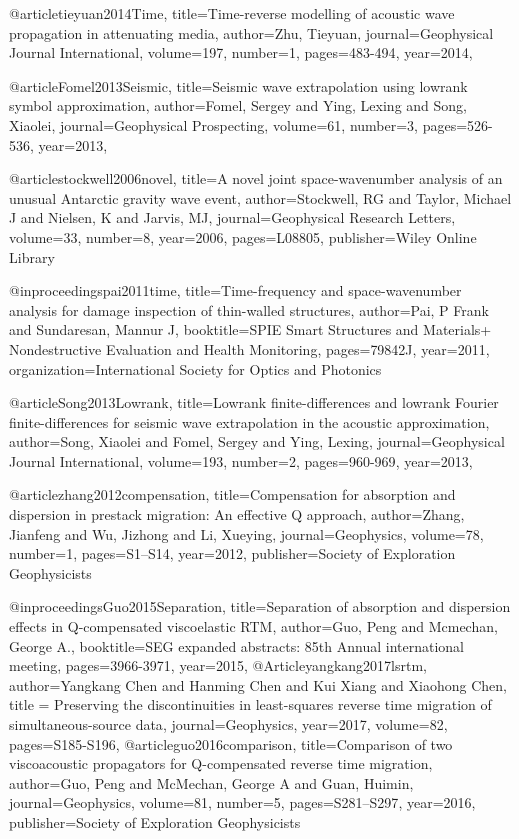 {@article{tieyuan2014Time,
  title={Time-reverse modelling of acoustic wave propagation in attenuating media},
  author={Zhu, Tieyuan},
  journal={Geophysical Journal International},
  volume={197},
  number={1},
  pages={483-494},
  year={2014},
}

@article{Fomel2013Seismic,
  title={Seismic wave extrapolation using lowrank symbol approximation},
  author={Fomel, Sergey and Ying, Lexing and Song, Xiaolei},
  journal={Geophysical Prospecting},
  volume={61},
  number={3},
  pages={526-536},
  year={2013},
}

@article{stockwell2006novel,
  title={A novel joint space-wavenumber analysis of an unusual Antarctic gravity wave event},
  author={Stockwell, RG and Taylor, Michael J and Nielsen, K and Jarvis, MJ},
  journal={Geophysical Research Letters},
  volume={33},
  number={8},
  year={2006},
  pages={L08805},
  publisher={Wiley Online Library}
}

@inproceedings{pai2011time,
  title={Time-frequency and space-wavenumber analysis for damage inspection of thin-walled structures},
  author={Pai, P Frank and Sundaresan, Mannur J},
  booktitle={SPIE Smart Structures and Materials+ Nondestructive Evaluation and Health Monitoring},
  pages={79842J},
  year={2011},
  organization={International Society for Optics and Photonics}
}


@article{Song2013Lowrank,
  title={Lowrank finite-differences and lowrank Fourier finite-differences for seismic wave extrapolation in the acoustic approximation},
  author={Song, Xiaolei and Fomel, Sergey and Ying, Lexing},
  journal={Geophysical Journal International},
  volume={193},
  number={2},
  pages={960-969},
  year={2013},
}

@article{zhang2012compensation,
  title={Compensation for absorption and dispersion in prestack migration: {A}n effective {Q} approach},
  author={Zhang, Jianfeng and Wu, Jizhong and Li, Xueying},
  journal={Geophysics},
  volume={78},
  number={1},
  pages={S1--S14},
  year={2012},
  publisher={Society of Exploration Geophysicists}
}

@inproceedings{Guo2015Separation,
  title={Separation of absorption and dispersion effects in {Q}-compensated viscoelastic {RTM}},
  author={Guo, Peng and Mcmechan, George A.},
  booktitle={SEG expanded abstracts: 85th Annual international meeting},
  pages={3966-3971},
  year={2015},
}
@Article{yangkang2017lsrtm,
  author={Yangkang Chen and Hanming Chen and Kui Xiang and Xiaohong Chen},
  title = {Preserving the discontinuities in least-squares reverse time migration of simultaneous-source data},
  journal={Geophysics},
  year=2017,
  volume=82,
  pages={S185-S196},
}
@article{guo2016comparison,
  title={Comparison of two viscoacoustic propagators for {Q}-compensated reverse time migration},
  author={Guo, Peng and McMechan, George A and Guan, Huimin},
  journal={Geophysics},
  volume={81},
  number={5},
  pages={S281--S297},
  year={2016},
  publisher={Society of Exploration Geophysicists}
}


}
